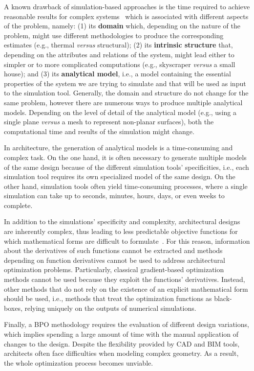 	A known drawback of simulation-based approaches is the time required to achieve reasonable results for complex systems~\cite{Law1991} which is associated with different aspects of the problem, namely: (1) its \textbf{domain} which, depending on the nature of the problem, might use different methodologies to produce the corresponding estimates (e.g., thermal \textit{versus} structural); (2) its \textbf{intrinsic structure} that, depending on the attributes and relations of the system, might lead either to simpler or to more complicated computations (e.g., skyscraper \textit{versus} a small house); and (3) its \textbf{analytical model}, i.e., a model containing the essential properties of the system we are trying to simulate and that will be used as input to the simulation tool. Generally, the domain and structure do not change for the same problem, however there are numerous ways to produce multiple analytical models. Depending on the level of detail of the analytical model (e.g., using a single plane \textit{versus} a mesh to represent non-planar surfaces), both the computational time and results of the simulation might change. 

	In architecture, the generation of analytical models is a time-consuming and complex task. On the one hand, it is often necessary to generate multiple models of the same design because of the different simulation tools' specificities, i.e., each simulation tool requires its own specialized model of the same design. On the other hand, simulation tools often yield time-consuming processes, where a single simulation can take up to seconds, minutes, hours, days, or even weeks to complete. 
	
	In addition to the simulations' specificity and complexity, architectural designs are inherently complex, thus leading to less predictable objective functions for which mathematical forms are difficult to formulate~\cite{Machairas2014}. For this reason, information about the derivatives of such functions cannot be extracted and methods depending on function derivatives cannot be used to address architectural optimization problems. Particularly, classical gradient-based optimization methods cannot be used because they exploit the functions' derivatives. Instead, other methods that do not rely on the existence of an explicit mathematical form should be used, i.e., methods that treat the optimization functions as black-boxes, relying uniquely on the outputs of numerical simulations.
	
	Finally, a \ac{BPO} methodology requires the evaluation of different design variations, which implies spending a large amount of time with the manual application of changes to the design. Despite the flexibility provided by \ac{CAD} and \ac{BIM} tools, architects often face difficulties when modeling complex geometry. As a result, the whole optimization process becomes unviable.
	
